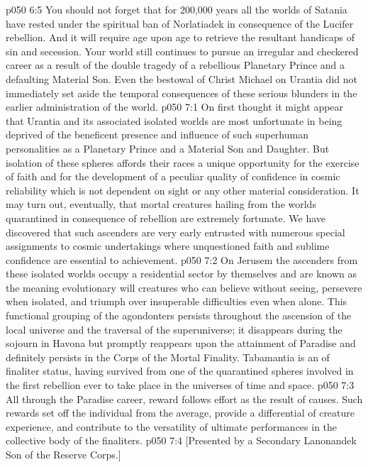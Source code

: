 \vs p050 6:5 \pc You should not forget that for 200,000 years all the worlds of Satania have rested under the spiritual ban of Norlatiadek in consequence of the Lucifer rebellion. And it will require age upon age to retrieve the resultant handicaps of sin and secession. Your world still continues to pursue an irregular and checkered career as a result of the double tragedy of a rebellious Planetary Prince and a defaulting Material Son. Even the bestowal of Christ Michael on Urantia did not immediately set aside the temporal consequences of these serious blunders in the earlier administration of the world.
\vs p050 7:1 On first thought it might appear that Urantia and its associated isolated worlds are most unfortunate in being deprived of the beneficent presence and influence of such superhuman personalities as a Planetary Prince and a Material Son and Daughter. But isolation of these spheres affords their races a unique opportunity for the exercise of faith and for the development of a peculiar quality of confidence in cosmic reliability which is not dependent on sight or any other material consideration. It may turn out, eventually, that mortal creatures hailing from the worlds quarantined in consequence of rebellion are extremely fortunate. We have discovered that such ascenders are very early entrusted with numerous special assignments to cosmic undertakings where unquestioned faith and sublime confidence are essential to achievement.
\vs p050 7:2 On Jerusem the ascenders from these isolated worlds occupy a residential sector by themselves and are known as the  meaning evolutionary will creatures who can believe without seeing, persevere when isolated, and triumph over insuperable difficulties even when alone. This functional grouping of the agondonters persists throughout the ascension of the local universe and the traversal of the superuniverse; it disappears during the sojourn in Havona but promptly reappears upon the attainment of Paradise and definitely persists in the Corps of the Mortal Finality. Tabamantia is an  of finaliter status, having survived from one of the quarantined spheres involved in the first rebellion ever to take place in the universes of time and space.
\vs p050 7:3 All through the Paradise career, reward follows effort as the result of causes. Such rewards set off the individual from the average, provide a differential of creature experience, and contribute to the versatility of ultimate performances in the collective body of the finaliters.
\vsetoff
\vs p050 7:4 [Presented by a Secondary Lanonandek Son of the Reserve Corps.]
\quizlink
